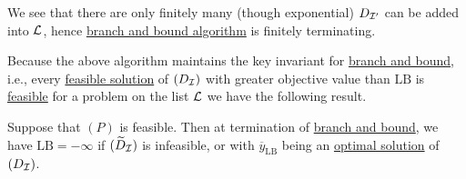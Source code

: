 \begin{remark}
	We see that there are only finitely many (though exponential) \(D_{\mathcal{\MakeUppercase{i}} ^\prime}\) can be added into \(\mathcal{\MakeUppercase{l}} \),
	hence \hyperref[algo:branch-and-bound-algorithm]{branch and bound algorithm} is finitely terminating.
\end{remark}

Because the above algorithm maintains the key invariant for \hyperref[algo:branch-and-bound-algorithm]{branch and bound}, i.e.,
every \hyperref[def:feasible-solution]{feasible solution} of \((D_{\mathcal{\MakeUppercase{i}} } )\) with greater objective value
than \(\mathrm{LB}\) is \hyperref[def:feasible-solution]{feasible} for a problem on the list \(\mathcal{\MakeUppercase{l}} \) we
have the following result.
\begin{theorem}\label{thm:lec23-1}
	Suppose that \((P)\) is feasible. Then at termination of \hyperref[algo:branch-and-bound-algorithm]{branch and bound}, we have
	\(\mathrm{LB}=-\infty\) if \((\widetilde{D} _\mathcal{\MakeUppercase{i}})\) is infeasible, or with \(\overline{y} _{\mathrm{LB}}\)
	being an \hyperref[def:optimal-solution]{optimal solution} of \((D_{\mathcal{\MakeUppercase{i}} } )\).
\end{theorem}

